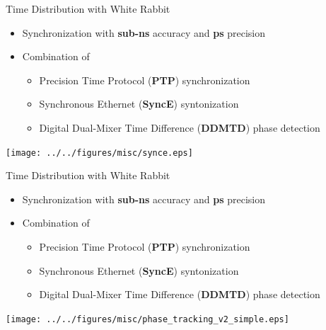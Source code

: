 \documentclass[compress,red]{beamer}
\begin{document}
\begin{frame}{Time Distribution with White Rabbit}

\begin{center}
  \begin{itemize}
    \item Synchronization with {\bf sub-ns} accuracy and {\bf ps} precision
    \item Combination of
	\begin{itemize}\small
	  \item Precision Time Protocol ({\bf PTP}) synchronization
	  \item Synchronous Ethernet ({\bf SyncE}) syntonization
	  \item Digital Dual-Mixer Time Difference ({\bf DDMTD}) phase detection
	\end{itemize}
  \end{itemize}
	\texttt{[image: ../../figures/misc/synce.eps]}
\end{center}
\end{frame}

\begin{frame}{Time Distribution with White Rabbit}

\begin{center}
  \begin{itemize}
    \item Synchronization with {\bf sub-ns} accuracy and {\bf ps} precision
    \item Combination of
	\begin{itemize}\small
	  \item Precision Time Protocol ({\bf PTP}) synchronization
	  \item Synchronous Ethernet ({\bf SyncE}) syntonization
	  \item Digital Dual-Mixer Time Difference ({\bf DDMTD}) phase detection
	\end{itemize}
  \end{itemize}
	\texttt{[image: ../../figures/misc/phase\_tracking\_v2\_simple.eps]}
\end{center}  
\end{frame}
\end{document}
